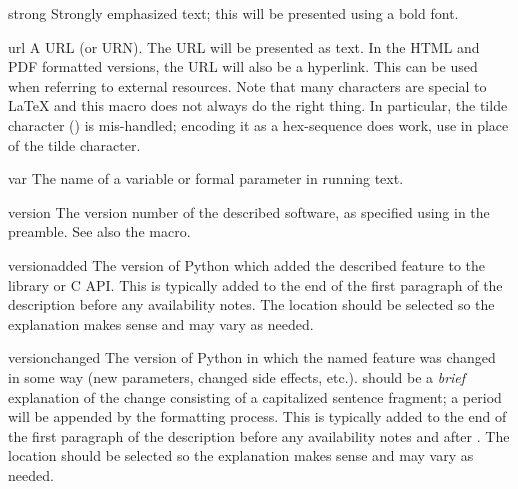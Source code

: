 \documentclass{howto}
\begin{document}
    \begin{macrodesc}{strong}{}
      Strongly emphasized text; this will be presented using a bold
      font.
    \end{macrodesc}

    \begin{macrodesc}{url}{}
      A URL (or URN).  The URL will be presented as text.  In the HTML 
      and PDF formatted versions, the URL will also be a hyperlink.
      This can be used when referring to external resources.  Note
      that many characters are special to \LaTeX{} and this macro
      does not always do the right thing.  In particular, the tilde
      character (\character{\~}) is mis-handled; encoding it as a
      hex-sequence does work, use  in place of the tilde
      character.
    \end{macrodesc}

    \begin{macrodesc}{var}{}
      The name of a variable or formal parameter in running text.
    \end{macrodesc}

    \begin{macrodesc}{version}{}
      The version number of the described software, as specified using
       in the preamble.  See also the
       macro.
    \end{macrodesc}

    \begin{macrodesc}{versionadded}{}
      The version of Python which added the described feature to the
      library or C API.  This is typically added to the end of the
      first paragraph of the description before any availability
      notes.  The location should be selected so the explanation makes
      sense and may vary as needed.
    \end{macrodesc}

    \begin{macrodesc}{versionchanged}{}
      The version of Python in which the named feature was changed in
      some way (new parameters, changed side effects, etc.).
       should be a \emph{brief} explanation of the
      change consisting of a capitalized sentence fragment; a
      period will be appended by the formatting process.
      This is typically added to the end of the first paragraph of the
      description before any availability notes and after
      .  The location should be selected so the
      explanation makes sense and may vary as needed.
    \end{macrodesc}
\end{document}
